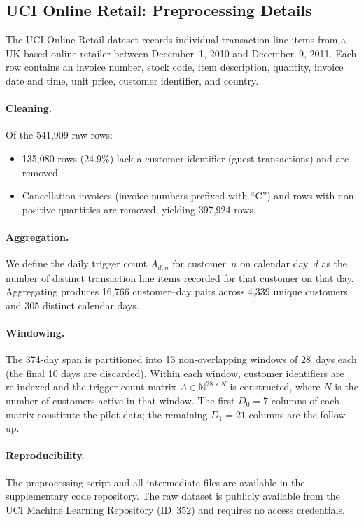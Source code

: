 
\subsection{UCI Online Retail: Preprocessing Details}\label{app:uci_preprocessing}

The UCI Online Retail dataset \citep{chen2012data} records
individual transaction line items from a UK-based online retailer
between December~1, 2010 and December~9, 2011.
Each row contains an invoice number, stock code, item description,
quantity, invoice date and time, unit price, customer identifier,
and country.

\paragraph{Cleaning.}
Of the 541{,}909 raw rows:
\begin{itemize}
    \item 135{,}080 rows (24.9\%) lack a customer identifier
          (guest transactions) and are removed.
    \item Cancellation invoices (invoice numbers prefixed with ``C'')
          and rows with non-positive quantities are removed,
          yielding 397{,}924 rows.
\end{itemize}

\paragraph{Aggregation.}
We define the daily trigger count $A_{d,n}$ for customer~$n$
on calendar day~$d$ as the number of distinct transaction line items
recorded for that customer on that day.
Aggregating produces 16{,}766 customer--day pairs
across 4{,}339 unique customers and 305 distinct calendar days.

\paragraph{Windowing.}
The 374-day span is partitioned into 13 non-overlapping windows
of 28~days each (the final 10 days are discarded).
Within each window, customer identifiers are re-indexed
and the trigger count matrix $A \in \mathbb{N}^{28 \times N}$
is constructed, where $N$ is the number of customers active
in that window.
The first $D_0 = 7$ columns of each matrix constitute the
pilot data; the remaining $D_1 = 21$ columns are the follow-up.

\paragraph{Reproducibility.}
The preprocessing script and all intermediate files are available
in the supplementary code repository.
The raw dataset is publicly available from the UCI Machine Learning
Repository (ID~352) and requires no access credentials.
